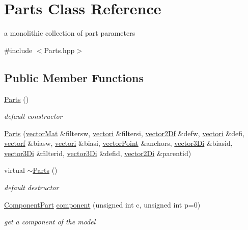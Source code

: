 \hypertarget{classParts}{\section{Parts Class Reference}
\label{classParts}
}


a monolithic collection of part parameters  




{\ttfamily \#include $<$Parts.\-hpp$>$}

\subsection*{Public Member Functions}
\begin{DoxyCompactItemize}
\item 
\hyperlink{classParts_a02ffe7271c4e268ee934710f91a203eb}{Parts} ()
\begin{DoxyCompactList}\small\item\em default constructor \end{DoxyCompactList}\item 
\hyperlink{classParts_ac8e1ad21c900825480d3f0e241808757}{Parts} (\hyperlink{types_8hpp_a3207a7addcfa415d1c83622febcb1e9b}{vector\-Mat} \&filtersw, \hyperlink{types_8hpp_a44529587d60e73bf0e689a82e5e70a55}{vectori} \&filtersi, \hyperlink{types_8hpp_a94f2d563f3725231a6f684b4dce4f1ef}{vector2\-Df} \&defw, \hyperlink{types_8hpp_a44529587d60e73bf0e689a82e5e70a55}{vectori} \&defi, \hyperlink{types_8hpp_a4da5db3ee9e284f719ef5764dbadffc8}{vectorf} \&biasw, \hyperlink{types_8hpp_a44529587d60e73bf0e689a82e5e70a55}{vectori} \&biasi, \hyperlink{types_8hpp_ac468fcf6870d6563ac8fa3669845afcc}{vector\-Point} \&anchors, \hyperlink{types_8hpp_a1f7c8ad00a53fb2d61b3656da9a6581d}{vector3\-Di} \&biasid, \hyperlink{types_8hpp_a1f7c8ad00a53fb2d61b3656da9a6581d}{vector3\-Di} \&filterid, \hyperlink{types_8hpp_a1f7c8ad00a53fb2d61b3656da9a6581d}{vector3\-Di} \&defid, \hyperlink{types_8hpp_a93a5e2cfd40d1ff1f10d8bbf11884c41}{vector2\-Di} \&parentid)
\item 
virtual \hyperlink{classParts_ac2df1f1a1d41444dff8ed4d4343aa64d}{$\sim$\-Parts} ()
\begin{DoxyCompactList}\small\item\em default destructor \end{DoxyCompactList}\item 
\hyperlink{classComponentPart}{Component\-Part} \hyperlink{classParts_a7aec123711ab73068f76b7e26a85d2d7}{component} (unsigned int c, unsigned int p=0)
\begin{DoxyCompactList}\small\item\em get a component of the model \end{DoxyCompactList}\item 

\end{DoxyCompactItemize}
